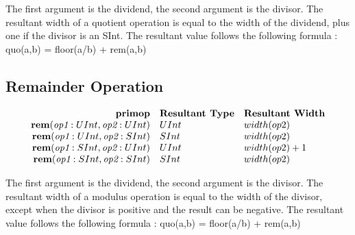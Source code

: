\documentclass[12pt]{article}
\begin{document}
The first argument is the dividend, the second argument is the divisor.
The resultant width of a quotient operation is equal to the width of the dividend, plus one if the divisor is an SInt.
The resultant value follows the following formula : quo(a,b) = floor(a/b) + rem(a,b)

\subsection{Remainder Operation}
\[
\begin{array}{rll}
\text{\bf primop} & \text{\bf Resultant Type} & \text{\bf Resultant Width} \\
\text{\bf rem}(\text{\em op1}:UInt, \text{\em op2}:UInt) &   UInt & width(op2)     \\
\text{\bf rem}(\text{\em op1}:UInt, \text{\em op2}:SInt) &   SInt & width(op2)     \\
\text{\bf rem}(\text{\em op1}:SInt, \text{\em op2}:UInt) &   UInt & width(op2) + 1 \\
\text{\bf rem}(\text{\em op1}:SInt, \text{\em op2}:SInt) &   SInt & width(op2)     \\
\end{array}
\]

The first argument is the dividend, the second argument is the divisor.
The resultant width of a modulus operation is equal to the width of the divisor, except when the divisor is positive and the result can be negative.
The resultant value follows the following formula : quo(a,b) = floor(a/b) + rem(a,b)
\end{document}
